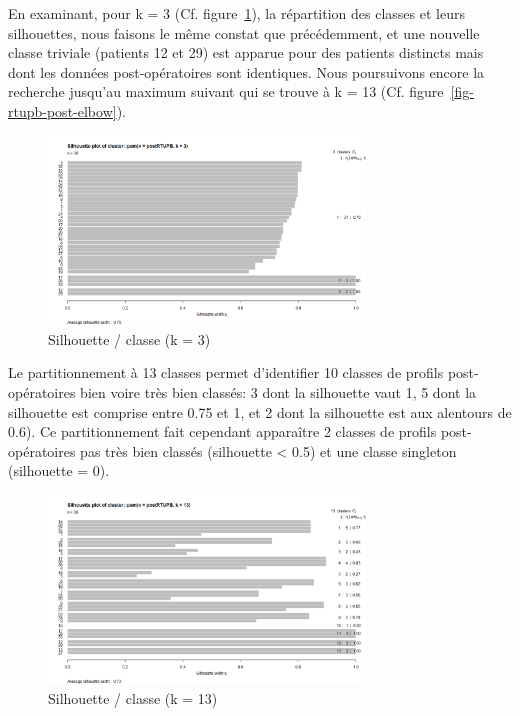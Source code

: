 En examinant, pour k = 3 (Cf. figure~\ref{fig-rtupb-post-pam-k3}), la répartition des classes et leurs silhouettes, nous faisons le même constat que précédemment, et une nouvelle classe triviale (patients 12 et 29) est apparue pour des patients distincts
mais dont les données post-opératoires sont identiques. Nous poursuivons encore la recherche jusqu'au maximum suivant qui se trouve à k = 13 (Cf. figure~\ref{fig-rtupb-post-elbow}).

\begin{figure}[H]
\centering
\includegraphics[width=0.75\textwidth]{../Fig/RTUPB/rtupb-sil-k3-post.png}
\caption{Silhouette / classe (k = 3)}
\label{fig-rtupb-post-pam-k3}
\end{figure}

Le partitionnement à 13 classes permet d'identifier 10 classes de profils post-opératoires bien voire très bien classés: 3 dont la silhouette vaut 1, 5 dont la silhouette est comprise entre 0.75 et 1, et 2 dont la silhouette
est aux alentours de 0.6). Ce partitionnement fait cependant apparaître 2 classes de profils post-opératoires pas très bien classés (silhouette < 0.5) et une classe singleton (silhouette = 0). 

\begin{figure}[H]
\centering
\includegraphics[width=0.75\textwidth]{../Fig/RTUPB/rtupb-sil-k13-post.png}
\caption{Silhouette / classe (k = 13)}
\label{fig-rtupb-post-pam-k13}
\end{figure}


